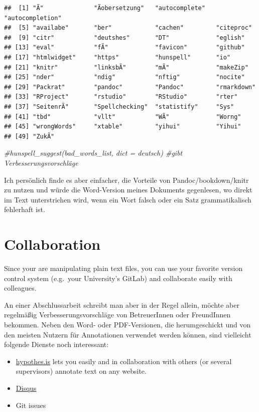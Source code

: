 \documentclass[]{book}
\makeatletter
\newenvironment{Shaded}{\begin{snugshade}}{\end{snugshade}}
\newcommand{\CommentTok}[1]{\textcolor[rgb]{0.56,0.35,0.01}{\textit{{#1}}}}
\providecommand{\tightlist}{%
  \setlength{\itemsep}{0pt}\setlength{\parskip}{0pt}}
\newenvironment{kframe}{%
\medskip{}
\setlength{\fboxsep}{.8em}
 \def\at@end@of@kframe{}%
 \ifinner\ifhmode%
  \def\at@end@of@kframe{\end{minipage}}%
  \begin{minipage}{\columnwidth}%
 \fi\fi%
 \def\FrameCommand##1{\hskip\@totalleftmargin \hskip-\fboxsep
 \colorbox{shadecolor}{##1}\hskip-\fboxsep
     \hskip-\linewidth \hskip-\@totalleftmargin \hskip\columnwidth}%
 \MakeFramed {\advance\hsize-\width
   \@totalleftmargin\z@ \linewidth\hsize
   \@setminipage}}%
 {\par\unskip\endMakeFramed%
 \at@end@of@kframe}
\renewenvironment{Shaded}{\begin{kframe}}{\end{kframe}}
\theoremstyle{definition}
\theoremstyle{definition}
\theoremstyle{remark}
\makeatother
\begin{document}
\begin{verbatim}
##  [1] "Ã"              "Ãobersetzung"   "autocomplete"   "autocompletion"
##  [5] "availabe"       "ber"            "cachen"         "citeproc"      
##  [9] "citr"           "deutshes"       "DT"             "eglish"        
## [13] "eval"           "fÃ"             "favicon"        "github"        
## [17] "htmlwidget"     "https"          "hunspell"       "io"            
## [21] "knitr"          "linksbÃ"        "mÃ"             "makeZip"       
## [25] "nder"           "ndig"           "nftig"          "nocite"        
## [29] "Packrat"        "pandoc"         "Pandoc"         "rmarkdown"     
## [33] "RProject"       "rstudio"        "RStudio"        "rter"          
## [37] "SeitenrÃ"       "Spellchecking"  "statistify"     "Sys"           
## [41] "tbd"            "vllt"           "WÃ"             "Worng"         
## [45] "wrongWords"     "xtable"         "yihui"          "Yihui"         
## [49] "ZukÃ"
\end{verbatim}

\begin{Shaded}
\begin{Highlighting}[]
\CommentTok{#hunspell_suggest(bad_words_list, dict = deutsch) #gibt Verbesserungsvorschläge}
\end{Highlighting}
\end{Shaded}

Ich persönlich finde es aber einfacher, die Vorteile von
Pandoc/bookdown/knitr zu nutzen und würde die Word-Version meines
Dokuments gegenlesen, wo direkt im Text unterstrichen wird, wenn ein
Wort falsch oder ein Satz grammatikalisch fehlerhaft ist.

\section{Collaboration}\label{collaboration}

Since your are manipulating plain text files, you can use your favorite
version control system (e.g.~your University's GitLab) and collaborate
easily with colleagues.

An einer Abschlussarbeit schreibt man aber in der Regel allein, möchte
aber regelmäßig Verbesserungsvorschläge von BetreuerInnen oder
FreundInnen bekommen. Neben den Word- oder PDF-Versionen, die
herumgeschickt und von den meisten Nutzern für Annotationen verwendet
werden können, sind vielleicht folgende Dienste noch interessant:

\begin{itemize}
\tightlist
\item
  \href{https://web.hypothes.is/}{hypothes.is} lets you easily and in
  collaboration with others (or several supervisors) annotate text on
  any website.
\item
  \href{https://disqus.com/}{Disqus}
\item
  Git issues
\end{itemize}
\end{document}
